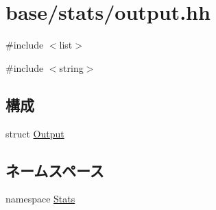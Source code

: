 \hypertarget{stats_2output_8hh}{
\section{base/stats/output.hh}
\label{stats_2output_8hh}
}
{\ttfamily \#include $<$list$>$}\par
{\ttfamily \#include $<$string$>$}\par
\subsection*{構成}
\begin{DoxyCompactItemize}
\item 
struct \hyperlink{structStats_1_1Output}{Output}
\end{DoxyCompactItemize}
\subsection*{ネームスペース}
\begin{DoxyCompactItemize}
\item 
namespace \hyperlink{namespaceStats}{Stats}
\end{DoxyCompactItemize}
